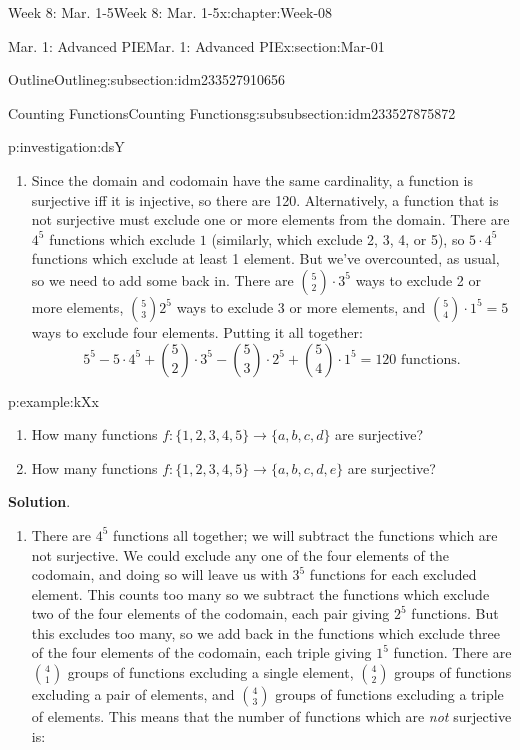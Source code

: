 \documentclass[oneside,10pt,]{book}
\newcommand{\blocktitlefont}{\relax}
\numberwithin{equation}{section}
\begin{document}
\begin{chapterptx}{Week 8: Mar. 1-5}{}{Week 8: Mar. 1-5}{}{}{x:chapter:Week-08}
\begin{sectionptx}{Mar. 1: Advanced PIE}{}{Mar. 1: Advanced PIE}{}{}{x:section:Mar-01}
\begin{subsectionptx}{Outline}{}{Outline}{}{}{g:subsection:idm233527910656}
\begin{subsubsectionptx}{Counting Functions}{}{Counting Functions}{}{}{g:subsubsection:idm233527875872}
\begin{investigation}{}{p:investigation:dsY}
\begin{enumerate}
\item{}Since the domain and codomain have the same cardinality, a function is surjective iff it is injective, so there are 120. Alternatively, a function that is not surjective must exclude one or more elements from the domain. There are \(4^5\) functions which exclude \(1\) (similarly, which exclude 2, 3, 4, or 5), so \(5\cdot 4^5\) functions which exclude at least 1 element. But we've overcounted, as usual, so we need to add some back in. There are \(\binom{5}{2}\cdot 3^5\) ways to exclude 2 or more elements, \(\binom{5}{3} 2^5\) ways to exclude 3 or more elements, and \(\binom{5}{4}\cdot 1^5 = 5\) ways to exclude four elements. Putting it all together:%
\begin{equation*}
5^5- 5\cdot 4^5 + \binom{5}{2}\cdot 3^5 - \binom{5}{3}\cdot 2^5 + \binom{5}{4}\cdot 1^5 = 120\text{ functions}.
\end{equation*}
%
\end{enumerate}
\end{investigation}%
\begin{example}{}{p:example:kXx}%
%
\begin{enumerate}
\item{}How many functions \(f: \{1,2,3,4,5\} \to \{a,b,c,d\}\) are surjective?%
\item{}How many functions \(f: \{1,2,3,4,5\} \to \{a,b,c,d,e\}\) are surjective?%
\end{enumerate}
%
\par\smallskip%
\noindent\textbf{\blocktitlefont Solution}.\hypertarget{p:solution:Lpu}{}\quad{}%
\begin{enumerate}
\item{}There are \(4^5\) functions all together; we will subtract the functions which are not surjective. We could exclude any one of the four elements of the codomain, and doing so will leave us with \(3^5\) functions for each excluded element. This counts too many so we subtract the functions which exclude two of the four elements of the codomain, each pair giving \(2^5\) functions. But this excludes too many, so we add back in the functions which exclude three of the four elements of the codomain, each triple giving \(1^5\) function. There are \({4 \choose 1}\) groups of functions excluding a single element, \({4 \choose 2}\) groups of functions excluding a pair of elements, and \({4 \choose 3}\) groups of functions excluding a triple of elements. This means that the number of functions which are \emph{not} surjective is:%
\begin{equation*}

\end{equation*}
\end{enumerate}
\end{example}
\end{subsubsectionptx}
\end{subsectionptx}
\end{sectionptx}
\end{chapterptx}
\end{document}
